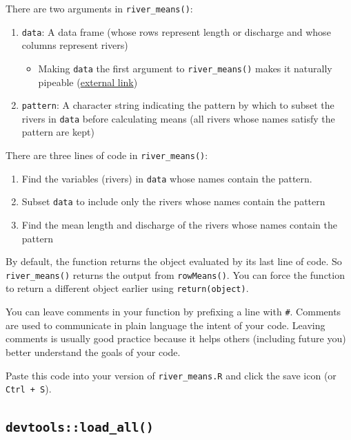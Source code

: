 \documentclass[
]{book}
\providecommand{\tightlist}{%
  \setlength{\itemsep}{0pt}\setlength{\parskip}{0pt}}
\begin{document}
There are two arguments in \texttt{river\_means()}:

\begin{enumerate}
\def\labelenumi{\arabic{enumi}.}
\tightlist
\item
  \texttt{data}: A data frame (whose rows represent length or discharge and whose columns represent rivers)

  \begin{itemize}
  \tightlist
  \item
    Making \texttt{data} the first argument to \texttt{river\_means()} makes it naturally pipeable (\href{https://r4ds.had.co.nz/pipes.html}{external link})
  \end{itemize}
\item
  \texttt{pattern}: A character string indicating the pattern by which to subset the rivers in \texttt{data} before calculating means (all rivers whose names satisfy the pattern are kept)
\end{enumerate}

There are three lines of code in \texttt{river\_means()}:

\begin{enumerate}
\def\labelenumi{\arabic{enumi}.}
\tightlist
\item
  Find the variables (rivers) in \texttt{data} whose names contain the pattern.
\item
  Subset \texttt{data} to include only the rivers whose names contain the pattern
\item
  Find the mean length and discharge of the rivers whose names contain the pattern
\end{enumerate}

By default, the function returns the object evaluated by its last line of code. So \texttt{river\_means()} returns the output from \texttt{rowMeans()}. You can force the function to return a different object earlier using \texttt{return(object)}.

You can leave comments in your function by prefixing a line with \texttt{\#}. Comments are used to communicate in plain language the intent of your code. Leaving comments is usually good practice because it helps others (including future you) better understand the goals of your code.

Paste this code into your version of \texttt{river\_means.R} and click the save icon (or \texttt{Ctrl\ +\ S}).

\hypertarget{load-all}{%
\subsection{\texorpdfstring{\texttt{devtools::load\_all()}}{devtools::load\_all()}}\label{load-all}}
\end{document}

